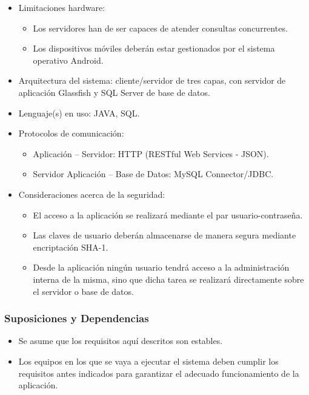 \begin{itemize}	
	\item Limitaciones hardware:
	\begin{itemize}
		\item Los servidores han de ser capaces de atender consultas concurrentes.
		\item Los dispositivos móviles deberán estar gestionados por el sistema operativo Android.
	\end{itemize}
	\item Arquitectura del sistema: cliente/servidor de tres capas, con servidor de aplicación Glassfish y SQL Server de base de datos.
	\item Lenguaje(s) en uso: JAVA, SQL.
	\item Protocolos de comunicación: 
	\begin{itemize}
		\item Aplicación -- Servidor: HTTP (RESTful Web Services - JSON).
		\item Servidor Aplicación -- Base de Datos: MySQL Connector/JDBC.
	\end{itemize}
	\item Consideraciones acerca de la seguridad:
	\begin{itemize}
		\item El acceso a la aplicación se realizará mediante el par usuario-contraseña.
		\item Las claves de usuario deberán almacenarse de manera segura mediante encriptación SHA-1.
		\item Desde la aplicación ningún usuario tendrá acceso a la administración interna de la misma, sino que dicha tarea se realizará directamente sobre el servidor o base de datos.
	\end{itemize}
\end{itemize}

\subsubsection{Suposiciones y Dependencias}

\begin{itemize}	
	\item Se asume que los requisitos aquí descritos son estables.
	\item Los equipos en los que se vaya a ejecutar el sistema deben cumplir los requisitos antes indicados para garantizar el adecuado funcionamiento de la aplicación.
\end{itemize}

